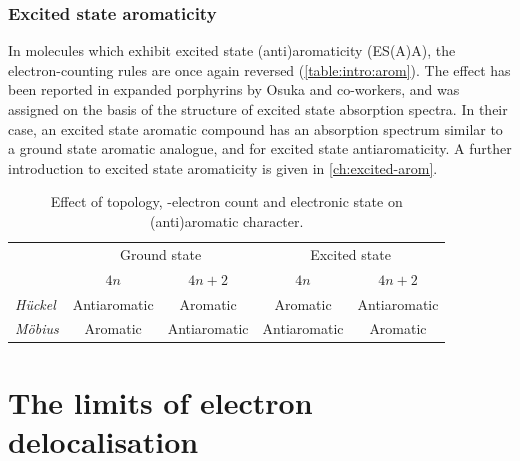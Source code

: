 		\subsubsection{Excited state aromaticity}

			In molecules which exhibit excited state (anti)aromaticity (ES(A)A), the electron-counting rules are once again reversed (\autoref{table:intro:arom}).\autocite{Baird1972,Rosenberg2014} The effect has been reported in expanded porphyrins by Osuka and co-workers, and was assigned on the basis of the structure of excited state absorption spectra.\autocite{Sung2015,Oh2016} In their case, an excited state aromatic compound has an absorption spectrum similar to a ground state aromatic analogue, and  for excited state antiaromaticity. A further introduction to excited state aromaticity is given in \autoref{ch:excited-arom}.


			\begin{table}[!ht]
				\centering
				\caption[]{Effect of topology, \pii{}-electron count and electronic state on (anti)aromatic character.}
				\label{table:intro:arom}
				\begin{threeparttable}
					\begin{tabular}{lcccc}
						 & \multicolumn{2}{c}{Ground state} & \multicolumn{2}{c}{Excited state} \\
						 & $4n$ & $4n+2$ & $4n$ & $4n+2$ \\
						 \midrule
						 \textit{H\"uckel} & Antiaromatic & Aromatic & Aromatic & Antiaromatic \\ 
						 \textit{M\"obius} & Aromatic & Antiaromatic & Antiaromatic & Aromatic \\
						\bottomrule
					\end{tabular}
				\end{threeparttable}
			\end{table}


	\section{The limits of electron delocalisation}


